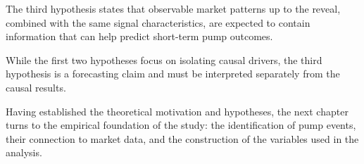 The third hypothesis states that observable market patterns up to the reveal, combined with the same signal characteristics, are expected to contain information that can help predict short-term pump outcomes.

While the first two hypotheses focus on isolating causal drivers, the third hypothesis is a forecasting claim and must be interpreted separately from the causal results.

Having established the theoretical motivation and hypotheses, the next chapter turns to the empirical foundation of the study: the identification of pump events, their connection to market data, and the construction of the variables used in the analysis.
